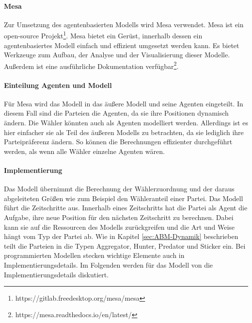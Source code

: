 \paragraph{Mesa}
Zur Umsetzung des agentenbasierten Modells wird Mesa \citep{mesa2020} verwendet. Mesa ist ein open-source Projekt\footnote{https://gitlab.freedesktop.org/mesa/mesa}. 
Mesa bietet ein Gerüst, innerhalb dessen ein agentenbasiertes Modell einfach und effizient umgesetzt werden kann. Es bietet Werkzeuge zum Aufbau, der Analyse und der Visualisierung dieser Modelle. Außerdem ist eine ausführliche Dokumentation verfügbar\footnote{https://mesa.readthedocs.io/en/latest/}.

\paragraph{Einteilung Agenten und Modell}
Für Mesa wird das Modell in das äußere Modell und seine Agenten eingeteilt. In diesem Fall sind die Parteien die Agenten, da sie ihre Positionen dynamisch ändern. Die Wähler könnten auch als Agenten modelliert werden. Allerdings ist es hier einfacher sie als Teil des äußeren Modells zu betrachten, da sie lediglich ihre Parteipräferenz ändern. So können die Berechnungen effizienter durchgeführt werden, als wenn alle Wähler einzelne Agenten wären.

\paragraph{Implementierung}
Das Modell übernimmt die Berechnung der Wählerzuordnung und der daraus abgeleiteten Größen wie zum Beispiel den Wähleranteil einer Partei. Das Modell führt die Zeitschritte aus. Innerhalb eines Zeitschritts hat die Partei als Agent die Aufgabe, ihre neue Position für den nächsten Zeitschritt zu berechnen. Dabei kann sie auf die Ressourcen des Modells zurückgreifen und die Art und Weise hängt vom Typ der Partei ab. Wie in Kapitel \ref{sec:ABM-Dynamik} beschrieben teilt \citet{laver2005policy} die Parteien in die Typen Aggregator, Hunter, Predator und Sticker ein. Bei programmierten Modellen stecken wichtige Elemente auch in Implementierungsdetails.
Im Folgenden werden für das Modell von \citet{laver2005policy} die Implementierungsdetails diskutiert.

